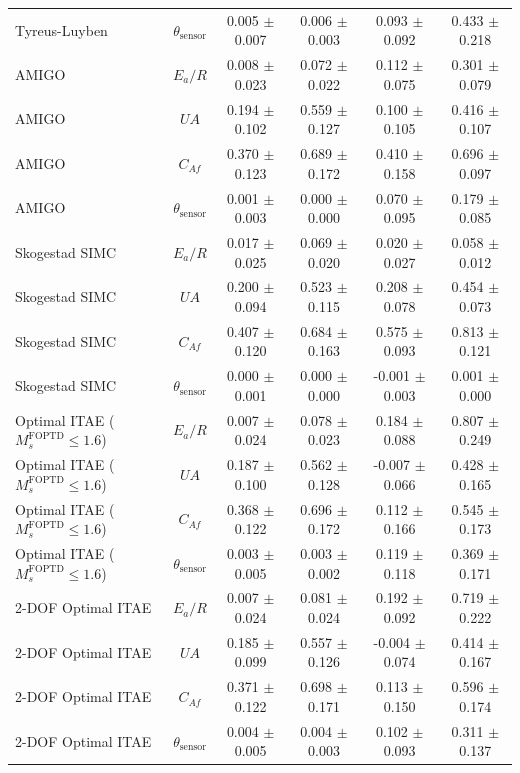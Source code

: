 \begin{table}[t]
{\begin{tabular}{lccccc}
Tyreus-Luyben & $\theta_{\mathrm{sensor}}$ & 0.005 $\pm$ 0.007 & 0.006 $\pm$ 0.003 & 0.093 $\pm$ 0.092 & 0.433 $\pm$ 0.218 \\
AMIGO & $E_a/R$ & 0.008 $\pm$ 0.023 & 0.072 $\pm$ 0.022 & 0.112 $\pm$ 0.075 & 0.301 $\pm$ 0.079 \\
AMIGO & $UA$ & 0.194 $\pm$ 0.102 & 0.559 $\pm$ 0.127 & 0.100 $\pm$ 0.105 & 0.416 $\pm$ 0.107 \\
AMIGO & $C_{Af}$ & 0.370 $\pm$ 0.123 & 0.689 $\pm$ 0.172 & 0.410 $\pm$ 0.158 & 0.696 $\pm$ 0.097 \\
AMIGO & $\theta_{\mathrm{sensor}}$ & 0.001 $\pm$ 0.003 & 0.000 $\pm$ 0.000 & 0.070 $\pm$ 0.095 & 0.179 $\pm$ 0.085 \\
Skogestad SIMC & $E_a/R$ & 0.017 $\pm$ 0.025 & 0.069 $\pm$ 0.020 & 0.020 $\pm$ 0.027 & 0.058 $\pm$ 0.012 \\
Skogestad SIMC & $UA$ & 0.200 $\pm$ 0.094 & 0.523 $\pm$ 0.115 & 0.208 $\pm$ 0.078 & 0.454 $\pm$ 0.073 \\
Skogestad SIMC & $C_{Af}$ & 0.407 $\pm$ 0.120 & 0.684 $\pm$ 0.163 & 0.575 $\pm$ 0.093 & 0.813 $\pm$ 0.121 \\
Skogestad SIMC & $\theta_{\mathrm{sensor}}$ & 0.000 $\pm$ 0.001 & 0.000 $\pm$ 0.000 & -0.001 $\pm$ 0.003 & 0.001 $\pm$ 0.000 \\
Optimal ITAE ($M_s^{\mathrm{FOPTD}} \leq 1.6$) & $E_a/R$ & 0.007 $\pm$ 0.024 & 0.078 $\pm$ 0.023 & 0.184 $\pm$ 0.088 & 0.807 $\pm$ 0.249 \\
Optimal ITAE ($M_s^{\mathrm{FOPTD}} \leq 1.6$) & $UA$ & 0.187 $\pm$ 0.100 & 0.562 $\pm$ 0.128 & -0.007 $\pm$ 0.066 & 0.428 $\pm$ 0.165 \\
Optimal ITAE ($M_s^{\mathrm{FOPTD}} \leq 1.6$) & $C_{Af}$ & 0.368 $\pm$ 0.122 & 0.696 $\pm$ 0.172 & 0.112 $\pm$ 0.166 & 0.545 $\pm$ 0.173 \\
Optimal ITAE ($M_s^{\mathrm{FOPTD}} \leq 1.6$) & $\theta_{\mathrm{sensor}}$ & 0.003 $\pm$ 0.005 & 0.003 $\pm$ 0.002 & 0.119 $\pm$ 0.118 & 0.369 $\pm$ 0.171 \\
2-DOF Optimal ITAE & $E_a/R$ & 0.007 $\pm$ 0.024 & 0.081 $\pm$ 0.024 & 0.192 $\pm$ 0.092 & 0.719 $\pm$ 0.222 \\
2-DOF Optimal ITAE & $UA$ & 0.185 $\pm$ 0.099 & 0.557 $\pm$ 0.126 & -0.004 $\pm$ 0.074 & 0.414 $\pm$ 0.167 \\
2-DOF Optimal ITAE & $C_{Af}$ & 0.371 $\pm$ 0.122 & 0.698 $\pm$ 0.171 & 0.113 $\pm$ 0.150 & 0.596 $\pm$ 0.174 \\
2-DOF Optimal ITAE & $\theta_{\mathrm{sensor}}$ & 0.004 $\pm$ 0.005 & 0.004 $\pm$ 0.003 & 0.102 $\pm$ 0.093 & 0.311 $\pm$ 0.137 \\
\bottomrule
\end{tabular}%
}
\end{table}

